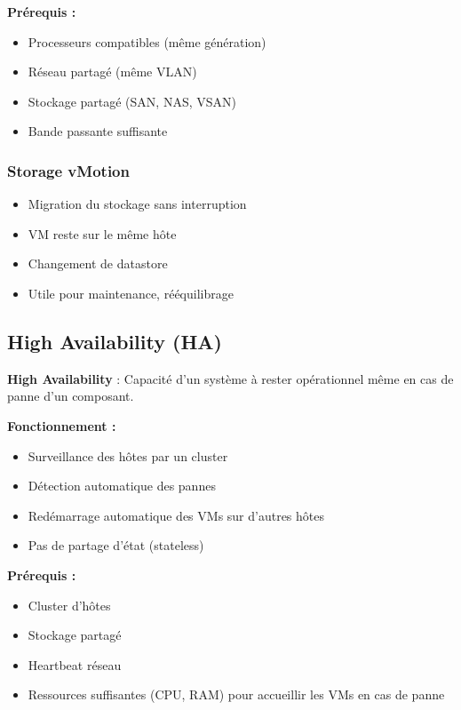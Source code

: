 \documentclass[11pt,a4paper]{article}
\begin{document}
\textbf{Prérequis :}
\begin{itemize}
    \item Processeurs compatibles (même génération)
    \item Réseau partagé (même VLAN)
    \item Stockage partagé (SAN, NAS, VSAN)
    \item Bande passante suffisante
\end{itemize}

\subsubsection{Storage vMotion}

\begin{itemize}
    \item Migration du stockage sans interruption
    \item VM reste sur le même hôte
    \item Changement de datastore
    \item Utile pour maintenance, rééquilibrage
\end{itemize}

\subsection{High Availability (HA)}

\begin{definitionbox}
\textbf{High Availability} : Capacité d'un système à rester opérationnel même en cas de panne d'un composant.
\end{definitionbox}

\textbf{Fonctionnement :}
\begin{itemize}
    \item Surveillance des hôtes par un cluster
    \item Détection automatique des pannes
    \item Redémarrage automatique des VMs sur d'autres hôtes
    \item Pas de partage d'état (stateless)
\end{itemize}

\textbf{Prérequis :}
\begin{itemize}
    \item Cluster d'hôtes
    \item Stockage partagé
    \item Heartbeat réseau
    \item Ressources suffisantes (CPU, RAM) pour accueillir les VMs en cas de panne
\end{itemize}
\end{document}
